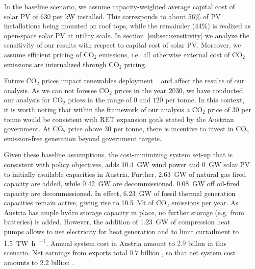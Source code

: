 \documentclass[review, 3p, times]{elsarticle} %
\newcommand{\COO}{\ensuremath{\mathrm{CO_2}} }
\begin{document}
    In the baseline scenario, we assume capacity-weighted average capital cost of solar PV of $630$ \EUR per kW
    installed.
    This corresponds to about 56\% of PV installations being mounted on roof tops, while the remainder (44\%) is
    realized as open-space solar PV at utility scale.
    In section~\ref{subsec:sensitivity} we analyze the sensitivity of our results with respect to capital cost of solar
    PV\@.
    Moreover, we assume efficient pricing of \COO emissions, i.e.\ all otherwise external cost of \COO emissions are
    internalized through \COO pricing.

    Future \COO prices impact renewables deployment ~\citep{Brown2020, Kirchner2019} and affect the results of our
    analysis.
    As we can not foresee \COO prices in the year 2030, we have conducted our analysis for \COO prices in the range of
    $0$ and $120$ \EUR per tonne.
    In this context, it is worth noting that within the framework of our analysis a \COO price of $30$ \EUR per tonne
    would be consistent with RET expansion goals stated by the Austrian government.
    At \COO price above $30$ \EUR per tonne, there is incentive to invest in \COO emission-free generation beyond
    government targets.

    Given these baseline assumptions, the cost-minimizing system set-up that is consistent with policy objectives, adds
    \SI{10.4}{\giga\watt} wind power and \SI{0}{\giga\watt} solar PV to initially available capacities in Austria.
    Further, \SI{2.63}{\giga\watt} of natural gas fired capacity are added, while \SI{0.42}{\giga\watt} are decommissioned.
    \SI{0.08}{\giga\watt} off oil-fired capacity are decommissioned.
    In effect, \SI{6.23}{\giga\watt} of fossil thermal generation capacities remain active, giving rise to
    \SI{10.5}{\mega\tonne} of \COO emissions per year.
    As Austria has ample hydro storage capacity in place, no further storage (e.g. from batteries) is added.
    However, the addition of \SI{1.23}{\giga\watt} of compression heat pumps allows to use electricity for heat
    generation and to limit curtailment to \SI{1.5}{\tera\watt\hour\per\year}.
    Annual system cost in Austria amount to $2.9$ billon \EUR in this scenario.
    Net earnings from exports total $0.7$ billion \EUR, so that net system cost amounts to $2.2$ billion \EUR.
\end{document}
